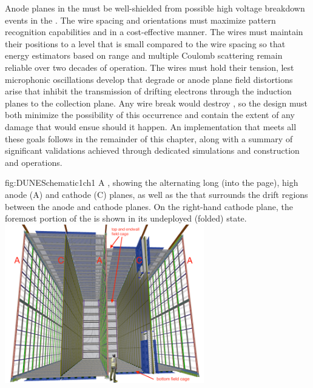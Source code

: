 Anode planes in the  must be well-shielded from possible high voltage breakdown events in the .  The  wire spacing and orientations must maximize pattern recognition capabilities and  in a cost-effective manner.  The  wires must maintain their positions to a level that is small compared to the wire spacing so that energy estimators based on range and multiple Coulomb scattering remain reliable over two decades of operation.  The wires must hold their tension, lest microphonic oscillations develop that degrade  or anode plane field distortions arise that inhibit the transmission of drifting electrons through the induction planes to the collection plane.  Any wire break would destroy , so the  design must both minimize the possibility of this occurrence and contain the extent of any damage that would ensue should it happen.  An  implementation that meets all these goals follows in the remainder of this chapter, along with a summary of significant validations achieved through dedicated simulations and  construction and operations.


\begin{dunefigure}{fig:DUNESchematic1ch1}
{A \nominalmodsize {}  , showing the alternating \sptpclen{} long (into the page), \tpcheight{} high anode (A) and cathode (C) planes, as well as the  that surrounds the drift regions between the anode and cathode planes. On the right-hand cathode plane, the foremost portion of the  is shown in its undeployed (folded) state.}
\includegraphics[width=0.65\textwidth]{graphics/DUNESchematic.png}
\end{dunefigure}

